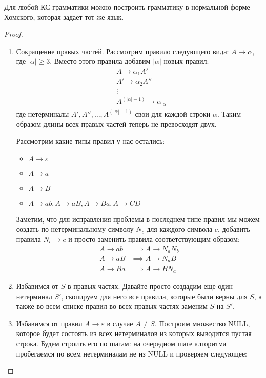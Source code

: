 \begin{theorem}
  Для любой КС-грамматики можно построить грамматику в нормальной форме Хомского, которая задает тот же язык.
\end{theorem}
\begin{proof} \quad

  \begin{enumerate}
    \item Сокращение правых частей. Рассмотрим правило следующего вида: $A \to \alpha$, где $|\alpha| \geq 3$. Вместо этого правила добавим $|\alpha|$ новых правил:
    \begin{align*}
      &A \to \alpha_1 A' \\
      &A' \to \alpha_2 A'' \\
      & \vdots \\
      &A^{(|\alpha| - 1)} \to \alpha_{|\alpha|}
    \end{align*}
    где нетерминалы $A', A'', \dotsc, A^{(|\alpha| - 1)}$ свои для каждой строки $\alpha$. Таким образом длины всех правых частей теперь не превосходят двух.
    
    Рассмотрим какие типы правил у нас остались:
    \begin{itemize}
      \item $A \to \varepsilon$
      \item $A \to a$
      \item $A \to B$
      \item $A \to ab, A \to aB, A \to Ba, A \to CD$
    \end{itemize}
    Заметим, что для исправления проблемы в последнем типе правил мы можем создать по нетерминальному символу $N_c$ для каждого символа $c$, добавить правила $N_c \to c$ и просто заменить правила соответствующим образом:
    \begin{align*}
      A \to ab &\implies A \to N_a N_b \\
      A \to aB &\implies A \to N_a B \\
      A \to Ba &\implies A \to B N_a
    \end{align*}
    \item Избавимся от $S$ в правых частях. Давайте просто создадим еще один нетерминал $S'$, скопируем для него все правила, которые были верны для $S$, а также во всем списке правил во всех правых частях заменим $S$ на $S'$.
    \item Избавимся от правил $A \to \varepsilon$ в случае $A \neq S$. Построим множество $\mathrm{NULL}$, которое будет состоять из всех нетерминалов из которых выводится пустая строка. Будем строить его по шагам: на очередном шаге алгоритма пробегаемся по всем нетерминалам не из $\mathrm{NULL}$ и проверяем следующее:


\end{enumerate}
\end{proof}
